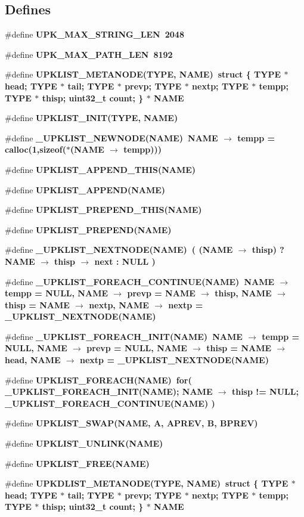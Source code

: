 \subsection*{Defines}
\begin{CompactItemize}
\item 
\#define \bf{UPK\_\-MAX\_\-STRING\_\-LEN}~2048
\item 
\#define \bf{UPK\_\-MAX\_\-PATH\_\-LEN}~8192
\item 
\#define \bf{UPKLIST\_\-METANODE}(TYPE, NAME)~struct \{ TYPE $\ast$ head; TYPE $\ast$ tail; TYPE $\ast$ prevp; TYPE $\ast$ nextp; TYPE $\ast$ tempp; TYPE $\ast$ thisp; uint32\_\-t count; \} $\ast$ NAME
\item 
\#define \bf{UPKLIST\_\-INIT}(TYPE, NAME)
\item 
\#define \bf{\_\-UPKLIST\_\-NEWNODE}(NAME)~NAME $\rightarrow$ tempp = calloc(1,sizeof($\ast$(NAME $\rightarrow$ tempp)))
\item 
\#define \bf{UPKLIST\_\-APPEND\_\-THIS}(NAME)
\item 
\#define \bf{UPKLIST\_\-APPEND}(NAME)
\item 
\#define \bf{UPKLIST\_\-PREPEND\_\-THIS}(NAME)
\item 
\#define \bf{UPKLIST\_\-PREPEND}(NAME)
\item 
\#define \bf{\_\-UPKLIST\_\-NEXTNODE}(NAME)~( (NAME $\rightarrow$ thisp) ? NAME $\rightarrow$ thisp $\rightarrow$ next : NULL )
\item 
\#define \bf{\_\-UPKLIST\_\-FOREACH\_\-CONTINUE}(NAME)~NAME $\rightarrow$ tempp = NULL, NAME $\rightarrow$ prevp = NAME $\rightarrow$ thisp, NAME $\rightarrow$ thisp = NAME $\rightarrow$ nextp, NAME $\rightarrow$ nextp = \_\-UPKLIST\_\-NEXTNODE(NAME)
\item 
\#define \bf{\_\-UPKLIST\_\-FOREACH\_\-INIT}(NAME)~NAME $\rightarrow$ tempp = NULL, NAME $\rightarrow$ prevp = NULL, NAME $\rightarrow$ thisp = NAME $\rightarrow$ head, NAME $\rightarrow$ nextp = \_\-UPKLIST\_\-NEXTNODE(NAME)
\item 
\#define \bf{UPKLIST\_\-FOREACH}(NAME)~for( \_\-UPKLIST\_\-FOREACH\_\-INIT(NAME); NAME $\rightarrow$ thisp != NULL; \_\-UPKLIST\_\-FOREACH\_\-CONTINUE(NAME) )
\item 
\#define \bf{UPKLIST\_\-SWAP}(NAME, A, APREV, B, BPREV)
\item 
\#define \bf{UPKLIST\_\-UNLINK}(NAME)
\item 
\#define \bf{UPKLIST\_\-FREE}(NAME)
\item 
\#define \bf{UPKDLIST\_\-METANODE}(TYPE, NAME)~struct \{ TYPE $\ast$ head; TYPE $\ast$ tail; TYPE $\ast$ prevp; TYPE $\ast$ nextp; TYPE $\ast$ tempp; TYPE $\ast$ thisp; uint32\_\-t count; \} $\ast$ NAME

\end{CompactItemize}
